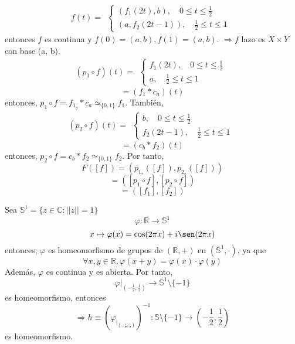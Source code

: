 \begin{dem}
\begin{itemize}
      \[ 
        f(t)  =
        \begin{aligned}
          \begin{cases}
            (f_{1}(2t), b), \quad 0 \leq t \leq \frac{1}{2} \\
            (a, f_{2}(2t - 1)), \quad \frac{1}{2} \leq t \leq 1
          \end{cases}
        \end{aligned} 
      \] 
      entonces $f$ es continua y $f(0) = (a, b), f(1) = (a, b)$.
      $\Rightarrow f$ lazo es $X \times Y$ con base (a, b).
      \[ 
        (p_{1} \circ f)(t)  =
        \begin{aligned}
          \begin{cases}
            f_{1}(2t), \quad 0 \leq t \leq \frac{1}{2} \\
            a, \quad \frac{1}{2} \leq t \leq 1
          \end{cases}
        \end{aligned} 
      \] 
      \[ 
        = (f_{1} * c_{a})(t)
      \] 
      entonces, $p_{1} \circ f = f_{1}_{y} * c_{a} \simeq_{\{ 0, 1 \}} f_{1}$. También,
      \[ 
        (p_{2} \circ f)(t)  =
        \begin{aligned}
          \begin{cases}
            b, \quad 0 \leq t \leq \frac{1}{2} \\
            f_{2}(2t - 1), \quad \frac{1}{2} \leq t \leq 1
          \end{cases}
        \end{aligned}
      \] 
      \[ 
        = (c_{b} * f_{2})(t) 
      \] 
      entonces, $p_{2} \circ f = c_{b} * f_{2} \simeq_{\{ 0, 1 \}} f_{2}$. Por tanto,
      \[ 
        F([f]) = (p_{1}_*([f]), p_{2}_*([f])) 
      \] 
      \[ 
        = ([p_{1} \circ f], [p_{2} \circ f]) 
      \] 
      \[ 
        = ([f_{1}], [f_{2}]) 
      \] 
  \end{itemize}
\end{dem}

\begin{obs}
  Sea $\mathbb{S}^{1} = \{ z \in \mathbb{C} : ||z|| = 1 \}$
  \[ 
    \varphi : \mathbb{R} \to \mathbb{S}^{1} 
  \] 
  \[ 
    x \mapsto \varphi(x) = \cos(2 \pi x) + i \sen(2 \pi x) 
  \] 
  entonces, $\varphi$ es homeomorfismo de grupos de $(\mathbb{R}, +)$ en $(\mathbb{S}^{1}, \cdot)$, ya que
  \[ 
    \forall x, y \in \mathbb{R}, \varphi(x + y) = \varphi(x) \cdot \varphi(y)
  \] 
  Además, $\varphi$ es continua y es abierta. Por tanto,
  \[ 
    \varphi|_{(-\frac{1}{2}, \frac{1}{2})} \to \mathbb{S}^{1}\setminus \{ -1 \}
  \] 
  es homeomorfismo, entonces
  \[ 
    \Rightarrow h \equiv (\varphi_|_{(-\frac{1}{2}, \frac{1}{2})})^{-1} : \mathbb{S}\setminus \{ -1 \} \to (-\frac{1}{2}, \frac{1}{2})
  \] 
  es homeomorfismo.
\end{obs}
